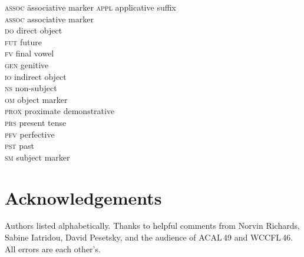 \documentclass[output=paper,colorlinks,citecolor=brown]{langscibook}
\begin{document}
\begin{multicols}{2}
\begin{tabbing}
\textsc{assoc} \hspace{1ex} \=  associative marker\kill
    \textsc{appl}  \>  applicative suffix\\
    \textsc{assoc}  \>  associative marker\\
    \textsc{do}  \>  direct object\\
    \textsc{fut}  \>  future\\
    \textsc{fv}  \>  final vowel\\
    \textsc{gen}  \>  genitive\\
    \textsc{io}  \>  indirect object\\
    \textsc{ns}  \>  non-subject\\
    \textsc{om}  \>  object marker\\
    \textsc{prox}  \>  proximate demonstrative\\
    \textsc{prs}  \>  present tense\\
    \textsc{pfv}  \>  perfective\\
    \textsc{pst}  \>  past\\
    \textsc{sm}  \>  subject marker
\end{tabbing}
\end{multicols}

\section*{Acknowledgements}

Authors listed alphabetically. Thanks to helpful comments from Norvin Richards, Sabine Iatridou, David Pesetsky, and the audience of ACAL\,49 and WCCFL\,46. All errors are each other's.


\printbibliography[heading=subbibliography,notkeyword=this]
\end{document}

